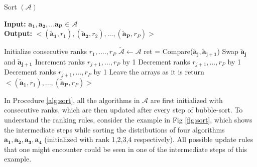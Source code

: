 \documentclass[conference]{IEEEtran}
\begin{document}
\begin{algorithm}
	\caption{Sort $(\mathcal{A})$ }
	\label{alg:sort}
	\hspace*{\algorithmicindent} \textbf{Input: } $ \mathbf{a_1},\mathbf{a_2},...\mathbf{a_P} \in \mathcal{A}$ \\
	\hspace*{\algorithmicindent} \textbf{Output: } $ < (\mathbf{\tilde{a}_1},r_1), (\mathbf{\tilde{a}_2}, r_2), ..., (\mathbf{\tilde{a}_P},r_P) > $
	\begin{algorithmic}[1] 
		\State Initialize consecutive ranks $r_1,....,r_P$
		\State $\tilde{\mathcal{A}} \leftarrow \mathcal{A}$
		\State ret = Compare($\mathbf{\tilde{a}_j}, \mathbf{\tilde{a}_{j+1}}$)
		\State Swap $\mathbf{\tilde{a}_{j}}$ and $\mathbf{\tilde{a}_{j+1}}$
		\State Increment ranks $r_{j+1}, ..., r_P$ by 1
		\EndIf
		\Else
		\State Decrement ranks $r_{j+1}, ..., r_P$ by 1
		\EndIf
		\EndIf
		\State Decrement ranks $r_{j+1}, ..., r_P$ by 1
		\EndIf
		\State Leave the arrays as it is
		\EndIf		
		\EndFor
		\EndFor
		\State return $< (\mathbf{\tilde{a}_1},r_1), ..., (\mathbf{\tilde{a}_P},r_P) >$
	\end{algorithmic}
\end{algorithm}
In Procedure \ref{alg:sort}, all the algorithms in $\mathcal{A}$ are first initialized with consecutive ranks, which are then updated after every step of bubble-sort. To understand the ranking rules, consider the example in Fig \ref{fig:sort}, which shows the intermediate steps while sorting the distributions of four algorithms $\mathbf{a_1}, \mathbf{a_2}, \mathbf{a_3},\mathbf{a_4}$ (initialized with rank 1,2,3,4 respectively). All possible update rules that one might encounter could be seen in one of the intermediate steps of this example.
\end{document}
